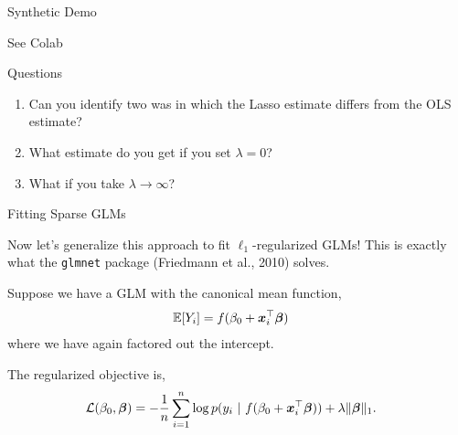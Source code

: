 \documentclass[aspectratio=169]{beamer}
\begin{document}
\begin{frame}[t,allowframebreaks]{Synthetic Demo}\label{synthetic-demo}

\begin{center}
    See Colab
\end{center}
\end{frame}

\begin{frame}[t,allowframebreaks]{Questions}\label{questions}
    
\begin{enumerate}
\def\labelenumi{\arabic{enumi}.}
\item
  Can you identify two was in which the Lasso estimate differs from the
  OLS estimate?
\item
  What estimate do you get if you set \(\lambda = 0\)?
\item
  What if you take \(\lambda \to \infty\)? 
\end{enumerate}
\end{frame}

\begin{frame}[t,allowframebreaks]{Fitting Sparse GLMs}\label{fitting-sparse-glms}

Now let's generalize this approach to fit \(\ell_1\)-regularized GLMs!
This is exactly what the \texttt{glmnet} package
(Friedmann et al., 2010) solves.

Suppose we have a GLM with the canonical mean function, \begin{align*}
\mathbb{E}[Y_i] &= f(\beta_0 + \boldsymbol{x}_i^\top \boldsymbol{\beta})
\end{align*} where we have again factored out the intercept.

The regularized objective is, \begin{align*}
\mathcal{L}(\beta_0, \boldsymbol{\beta})
&= -\frac{1}{n} \sum_{i=1}^n \log p(y_i ~\vert~ f(\beta_0 + \boldsymbol{x}_i^\top \boldsymbol{\beta})) + \lambda \|\boldsymbol{\beta} \|_1.
\end{align*}
\end{frame}
\end{document}
